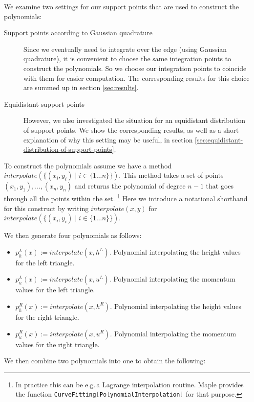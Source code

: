 \documentclass[a4paper, twoside]{article}
\begin{document}
We examine two settings for our support points that are used to construct the polynomials:

\begin{description}
\item[Support points according to Gaussian quadrature] Since we eventually need to integrate over the edge (using Gaussian quadrature), it is convenient to choose the same integration points to construct the polynomials. So we choose our integration points to coincide with them for easier computation. The corresponding results for this choice are summed up in section \ref{sec:results}.
\item[Equidistant support points] However, we also investigated the situation for an equidistant distribution of support points. We show the corresponding results, as well as a short explanation of why this setting may be useful, in section \ref{sec:equidistant-distribution-of-support-points}.
\end{description}

To construct the polynomials assume we have a method $interpolate\left(\{\left(x_i,y_i\right) \mid i \in \{1 \dots n\}\}\right)$.
This method takes a set of points $\left(x_1,y_1\right),\dots,\left(x_n,y_n\right)$ and returns the polynomial of degree $n-1$ that goes through all the points within the set.
\footnote{In practice this can be e.g.\,a Lagrange interpolation routine. Maple provides the function \texttt{CurveFitting[PolynomialInterpolation]} for that purpose.}
Here we introduce a notational shorthand for this construct by writing $interpolate\left(x,y\right)$ for $interpolate\left(\{\left(x_i,y_i\right) \mid i \in \{1 \dots n\}\}\right)$.

We then generate four polynomials as follows:

\begin{itemize}
\item $p^L_h(x) := interpolate (x,h^L)$. Polynomial interpolating the height values for the left triangle.
\item $p^L_u(x) := interpolate (x,u^L)$. Polynomial interpolating the momentum values for the left triangle.
\item $p^R_h(x) := interpolate (x,h^R)$. Polynomial interpolating the height values for the right triangle.
\item $p^R_u(x) := interpolate (x,u^R)$. Polynomial interpolating the momentum values for the right triangle.
\end{itemize}

We then combine two polynomials into one to obtain the following:
\end{document}
